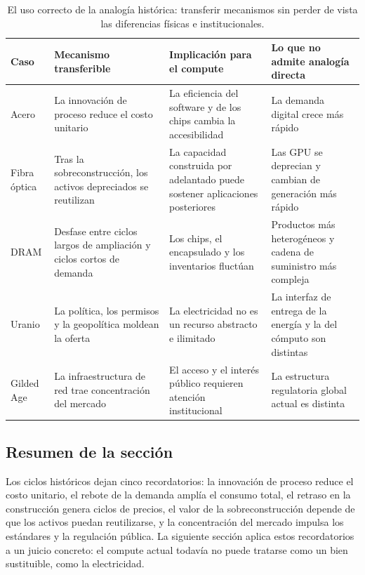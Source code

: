 \begin{table}[H]
\centering
\begin{tabular}{L{0.14\textwidth}L{0.21\textwidth}L{0.23\textwidth}L{0.25\textwidth}}
\toprule
Caso & Mecanismo transferible & Implicación para el compute & Lo que no admite analogía directa \\
\midrule
Acero & La innovación de proceso reduce el costo unitario & La eficiencia del software y de los chips cambia la accesibilidad & La demanda digital crece más rápido \\
Fibra óptica & Tras la sobreconstrucción, los activos depreciados se reutilizan & La capacidad construida por adelantado puede sostener aplicaciones posteriores & Las GPU se deprecian y cambian de generación más rápido \\
DRAM & Desfase entre ciclos largos de ampliación y ciclos cortos de demanda & Los chips, el encapsulado y los inventarios fluctúan & Productos más heterogéneos y cadena de suministro más compleja \\
Uranio & La política, los permisos y la geopolítica moldean la oferta & La electricidad no es un recurso abstracto e ilimitado & La interfaz de entrega de la energía y la del cómputo son distintas \\
Gilded Age & La infraestructura de red trae concentración del mercado & El acceso y el interés público requieren atención institucional & La estructura regulatoria global actual es distinta \\
\bottomrule
\end{tabular}
\caption{El uso correcto de la analogía histórica: transferir mecanismos sin perder de vista las diferencias físicas e institucionales.}
\end{table}

\subsection{Resumen de la sección}

Los ciclos históricos dejan cinco recordatorios: la innovación de proceso reduce el costo unitario, el rebote de la demanda amplía el consumo total, el retraso en la construcción genera ciclos de precios, el valor de la sobreconstrucción depende de que los activos puedan reutilizarse, y la concentración del mercado impulsa los estándares y la regulación pública. La siguiente sección aplica estos recordatorios a un juicio concreto: el compute actual todavía no puede tratarse como un bien sustituible, como la electricidad.
